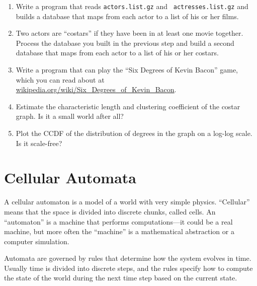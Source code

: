\documentclass[10pt]{book}
\begin{document}
\begin{ex}
\begin{enumerate}
\item Write a program that reads {\tt actors.list.gz} and {\tt
  actresses.list.gz} and builds a database
that maps from each actor to a list of his or her films.

\item Two actors are ``costars'' if they have been in at least one
  movie together.  Process the database you built in the previous step
  and build a second database that maps from each actor to a list of
  his or her costars.

\item Write a program that can play the ``Six Degrees of Kevin
  Bacon'' game, which you can read about at
  \url{wikipedia.org/wiki/Six_Degrees_of_Kevin_Bacon}.

\item Estimate the characteristic length and clustering coefficient of
  the costar graph.  Is it a small world after all?

\item Plot the CCDF of the distribution of degrees in the graph on a
  log-log scale.  Is it scale-free?

\end{enumerate}

\end{ex}








\chapter{Cellular Automata}

A cellular automaton is a model of a world with very simple
physics.  ``Cellular'' means that the space is divided into
discrete chunks, called cells.  An ``automaton'' is a machine
that performs computations---it could be a real machine, but
more often the ``machine'' is a mathematical abstraction or
a computer simulation.

Automata are governed by rules that determine how the system
evolves in time.  Usually time is divided into discrete steps,
and the rules specify how to compute the state of the world
during the next time step based on the current state.
\end{document}
